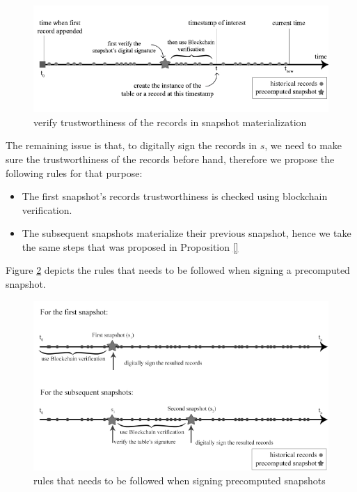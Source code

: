 \begin{figure}
	\centering
	\includegraphics[width=\textwidth]{figs/trusted_snapshot_materialization.pdf}
	\caption{verify trustworthiness of the records in snapshot materialization}
	\label{fig:blockchain_snapshot_materialization}
\end{figure}

The remaining issue is that, to digitally sign the records in $s$, we need to make sure the trustworthiness of the records before hand, therefore we propose the following rules for that purpose:

\begin{itemize}
	\item The first snapshot's records trustworthiness is checked using blockchain verification.
	\item The subsequent snapshots materialize their previous snapshot, hence we take the same steps that was proposed in Proposition \ref{}
\end{itemize}

Figure \ref{fig:signing_snapshots} depicts the rules that needs to be followed when signing a precomputed snapshot.

\begin{figure}
	\centering
	\includegraphics[width=\textwidth]{figs/signing_snapshots.pdf}
	\caption{rules that needs to be followed when signing precomputed snapshots}
	\label{fig:signing_snapshots}
\end{figure}

